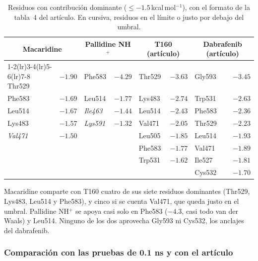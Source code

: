 \documentclass[11pt,a4paper]{article}
\newcommand{\kcal}{\,kcal\,mol$^{-1}$}
\begin{document}
\begin{table}[H]
\centering\footnotesize
\setlength{\tabcolsep}{3pt}
\begin{tabular}{@{}lr lr lr lr@{}}
\toprule
\multicolumn{2}{c}{Macaridine} & \multicolumn{2}{c}{Pallidine NH$^+$} & \multicolumn{2}{c}{T160 (artículo)} & \multicolumn{2}{c}{Dabrafenib (artículo)} \\
\cmidrule(lr){1-2}\cmidrule(lr){3-4}\cmidrule(lr){5-6}\cmidrule(lr){7-8}
Thr529 & $-1.90$ & Phe583 & $-4.29$ & Thr529 & $-3.63$ & Gly593 & $-3.45$ \\
Phe583 & $-1.69$ & Leu514 & $-1.77$ & Lys483 & $-2.74$ & Trp531 & $-2.63$ \\
Leu514 & $-1.67$ & \textit{Ile463} & \textit{$-1.44$} & Leu514 & $-2.43$ & Phe583 & $-2.36$ \\
Lys483 & $-1.57$ & \textit{Lys591} & \textit{$-1.32$} & Val471 & $-2.05$ & Thr529 & $-2.23$ \\
\textit{Val471} & \textit{$-1.50$} & & & Leu505 & $-1.85$ & Leu514 & $-1.93$ \\
 & & & & Phe583 & $-1.77$ & Val471 & $-1.89$ \\
 & & & & Trp531 & $-1.62$ & Ile527 & $-1.81$ \\
 & & & & & & Cys532 & $-1.70$ \\
\bottomrule
\end{tabular}
\caption{Residuos con contribución dominante ($\le -1.5$\kcal), con el formato de la tabla~4 del artículo. En
cursiva, residuos en el límite o justo por debajo del umbral.}
\label{tab:dom50}
\end{table}

Macaridine comparte con T160 cuatro de sus siete residuos dominantes (Thr529, Lys483, Leu514 y Phe583), y cinco
si se cuenta Val471, que queda justo en el umbral. Pallidine NH$^+$ se apoya casi solo en Phe583 ($-4.3$, casi
todo van der Waals) y Leu514. Ninguno de los dos aprovecha Gly593 ni Cys532, los anclajes del dabrafenib.

\subsubsection{Comparación con las pruebas de 0.1 ns y con el artículo}
\end{document}
